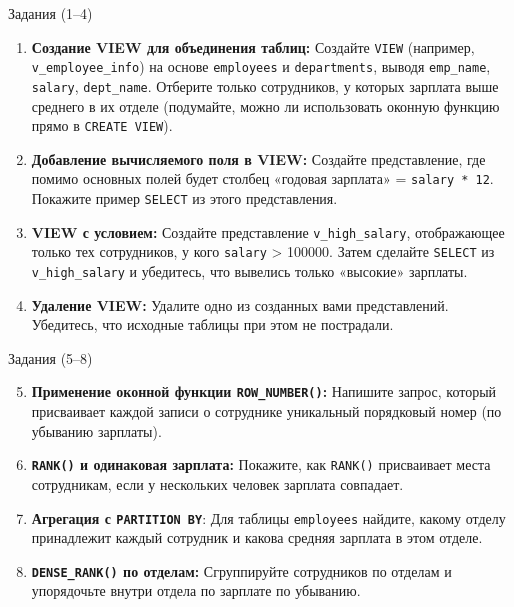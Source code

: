 \documentclass{beamer}
\begin{document}
\begin{frame}{Задания (1--4)}
	\begin{enumerate}
		\item \textbf{Создание VIEW для объединения таблиц:}
		      Создайте \texttt{VIEW} (например, \texttt{v\_employee\_info}) на основе \texttt{employees} и \texttt{departments},
		      выводя \texttt{emp\_name}, \texttt{salary}, \texttt{dept\_name}. Отберите только сотрудников, у которых зарплата выше среднего в их отделе
		      (подумайте, можно ли использовать оконную функцию прямо в \texttt{CREATE VIEW}).

		\item \textbf{Добавление вычисляемого поля в VIEW:}
		      Создайте представление, где помимо основных полей будет столбец «годовая зарплата» = \texttt{salary * 12}.
		      Покажите пример \texttt{SELECT} из этого представления.

		\item \textbf{VIEW с условием:}
		      Создайте представление \texttt{v\_high\_salary}, отображающее только тех сотрудников, у кого \texttt{salary} > 100000.
		      Затем сделайте \texttt{SELECT} из \texttt{v\_high\_salary} и убедитесь, что вывелись только «высокие» зарплаты.

		\item \textbf{Удаление VIEW:}
		      Удалите одно из созданных вами представлений. Убедитесь, что исходные таблицы при этом не пострадали.
	\end{enumerate}
\end{frame}

\begin{frame}{Задания (5--8)}
	\begin{enumerate}
		\setcounter{enumi}{4}
		\item \textbf{Применение оконной функции \texttt{ROW\_NUMBER()}:}
		      Напишите запрос, который присваивает каждой записи о сотруднике уникальный порядковый номер (по убыванию зарплаты).

		\item \textbf{\texttt{RANK()} и одинаковая зарплата:}
		      Покажите, как \texttt{RANK()} присваивает места сотрудникам, если у нескольких человек зарплата совпадает.

		\item \textbf{Агрегация с \texttt{PARTITION BY}}:
		      Для таблицы \texttt{employees} найдите, какому отделу принадлежит каждый сотрудник и какова средняя зарплата в этом отделе.

		\item \textbf{\texttt{DENSE\_RANK()} по отделам:}
		      Сгруппируйте сотрудников по отделам и упорядочьте внутри отдела по зарплате по убыванию.
		     
	\end{enumerate}
\end{frame}
\end{document}
